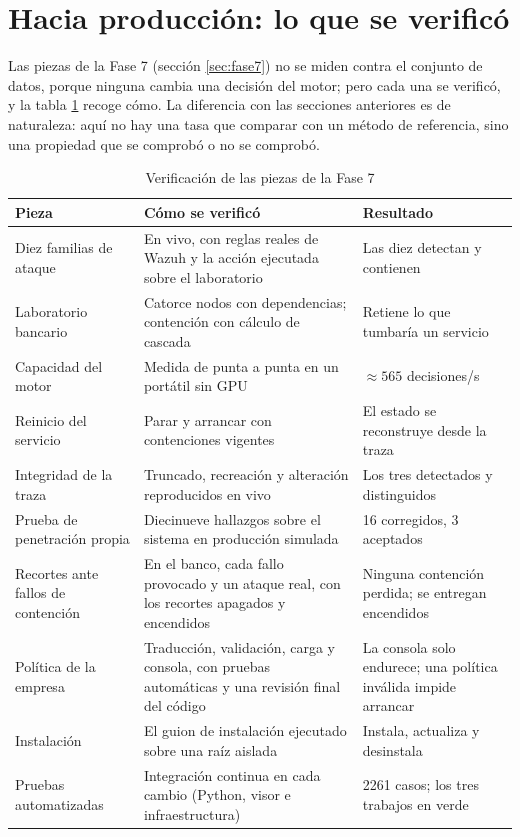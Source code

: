 \section{Hacia producción: lo que se verificó}
\label{sec:verif-produccion}

Las piezas de la Fase 7 (sección \ref{sec:fase7}) no se miden contra el conjunto de datos, porque
ninguna cambia una decisión del motor; pero cada una se verificó, y la tabla
\ref{tab:verif-produccion} recoge cómo. La diferencia con las secciones anteriores es de naturaleza:
aquí no hay una tasa que comparar con un método de referencia, sino una propiedad que se comprobó o
no se comprobó.

\begin{table}[H]
  \centering
  \caption{Verificación de las piezas de la Fase 7}
  \label{tab:verif-produccion}
  \begin{tabular}{@{}p{}p{}p{}@{}}
    \toprule
    \textbf{Pieza} & \textbf{Cómo se verificó} & \textbf{Resultado} \\
    \midrule
    Diez familias de ataque & En vivo, con reglas reales de Wazuh y la acción ejecutada sobre el
      laboratorio & Las diez detectan y contienen \\
    Laboratorio bancario & Catorce nodos con dependencias; contención con cálculo de cascada &
      Retiene lo que tumbaría un servicio \\
    Capacidad del motor & Medida de punta a punta en un portátil sin GPU & $\approx 565$
      decisiones/s \\
    Reinicio del servicio & Parar y arrancar con contenciones vigentes & El estado se reconstruye
      desde la traza \\
    Integridad de la traza & Truncado, recreación y alteración reproducidos en vivo & Los tres
      detectados y distinguidos \\
    Prueba de penetración propia & Diecinueve hallazgos sobre el sistema en producción simulada &
      16 corregidos, 3 aceptados \\
    Recortes ante fallos de contención & En el banco, cada fallo provocado y un ataque real, con los
      recortes apagados y encendidos & Ninguna contención perdida; se entregan encendidos \\
    Política de la empresa & Traducción, validación, carga y consola, con pruebas automáticas y
      una revisión final del código & La consola solo endurece; una política inválida impide
      arrancar \\
    Instalación & El guion de instalación ejecutado sobre una raíz aislada & Instala, actualiza y
      desinstala \\
    Pruebas automatizadas & Integración continua en cada cambio (Python, visor e infraestructura) &
      2261 casos; los tres trabajos en verde \\
    \bottomrule
  \end{tabular}
\end{table}

